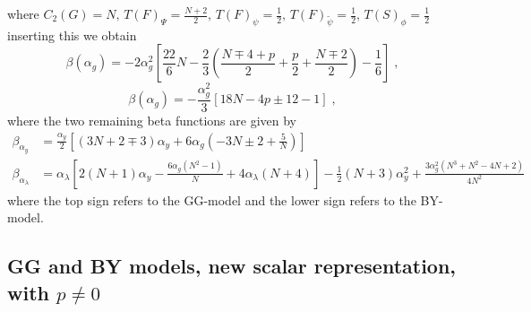 where $C_2(G)=N, \,T(F)_\Psi=\frac{N+2}{2},\, T(F)_\psi=\frac{1}{2},\, T(F)_{\tilde\psi}=\frac{1}{2},\, T(S)_\phi=\frac{1}{2}$ inserting this we obtain
\begin{equation}
    \beta(\alpha_g)=-{2\alpha_g^2}\left[\frac{22}{6}N-\frac{2}{3}\left(\frac{N\mp4+p}{2}+\frac{p}{2}+\frac{N\mp2}{2}\right)-\frac{1}{6}\right]\;,
\end{equation}
\begin{equation}
    \beta(\alpha_g)=-\frac{\alpha_g^2}{3}\left[18N-4p\pm{12}-1\right]\;,
\end{equation}
where the two remaining beta functions are given by
\begin{align}
    \beta_{\alpha_y}&= \frac{\alpha_y}{2}\left[(3 N+2\mp3)\alpha_y+6 \alpha_g\left(-3 N\pm2+\frac 5N\right) \right]
   \\
   \beta_{\alpha_\lambda}&=\alpha_\lambda\left[2(N+1)\alpha_y-\frac{6 \alpha_g 
   \left(N^2-1\right)}{N}+4 \alpha_\lambda (N+4)\right]-\frac{1}{2} (N+3)
  \alpha_y^2+\frac{3 \alpha_g^2 \left(N^3+N^2-4 N+2\right)}{4 N^2} 
\end{align}
where the top sign refers to the GG-model and the lower sign refers to the BY-model. 
\subsection{GG and BY models, new scalar representation, with $p\neq0$}
 

